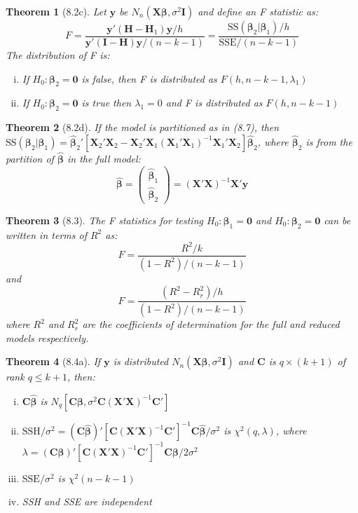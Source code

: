 \documentclass{article}
\newtheorem{theorem}{Theorem}[section]
\begin{document}
\begin{theorem}[8.2c]
Let $\mathbf{y}$ be $N_n(\mathbf{X}\boldsymbol{\beta}, \sigma^2\mathbf{I})$ and define an F statistic as:
\[F = \frac{\mathbf{y}'(\mathbf{H}-\mathbf{H}_1)\mathbf{y}/h}{\mathbf{y}'(\mathbf{I}-\mathbf{H})\mathbf{y}/(n-k-1)} = \frac{\text{SS}(\boldsymbol{\beta}_2|\boldsymbol{\beta}_1)/h}{\text{SSE}/(n-k-1)}\]
The distribution of F is:
\begin{enumerate}[(i)]
\item If $H_0:\boldsymbol{\beta}_2 = \mathbf{0}$ is false, then F is distributed as $F(h,n-k-1,\lambda_1)$
\item If $H_0:\boldsymbol{\beta}_2 = \mathbf{0}$ is true then $\lambda_1 = 0$ and F is distributed as $F(h,n-k-1)$
\end{enumerate}
\end{theorem}

\begin{theorem}[8.2d]
If the model is partitioned as in (8.7), then $\text{SS}(\boldsymbol{\beta}_2|\boldsymbol{\beta}_1) = \hat{\boldsymbol{\beta}}_2'[\mathbf{X}_2'\mathbf{X}_2 - \mathbf{X}_2'\mathbf{X}_1(\mathbf{X}_1'\mathbf{X}_1)^{-1}\mathbf{X}_1'\mathbf{X}_2]\hat{\boldsymbol{\beta}}_2$, where $\hat{\boldsymbol{\beta}}_2$ is from the partition of $\hat{\boldsymbol{\beta}}$ in the full model:
\[\hat{\boldsymbol{\beta}} = \begin{pmatrix} \hat{\boldsymbol{\beta}}_1 \\ \hat{\boldsymbol{\beta}}_2\end{pmatrix} = (\mathbf{X}'\mathbf{X})^{-1}\mathbf{X}'\mathbf{y}\]
\end{theorem}

\begin{theorem}[8.3]
The F statistics for testing $H_0: \boldsymbol{\beta}_1 = \mathbf{0}$ and $H_0: \boldsymbol{\beta}_2 = \mathbf{0}$ can be written in terms of $R^2$ as:
\[F = \frac{R^2/k}{(1-R^2)/(n-k-1)}\]
and
\[F = \frac{(R^2 - R_r^2)/h}{(1-R^2)/(n-k-1)}\]
where $R^2$ and $R_r^2$ are the coefficients of determination for the full and reduced models respectively.
\end{theorem}

\begin{theorem}[8.4a]
If $\mathbf{y}$ is distributed $N_n(\mathbf{X}\boldsymbol{\beta}, \sigma^2\mathbf{I})$ and $\mathbf{C}$ is $q \times (k+1)$ of rank $q \leq k+1$, then:
\begin{enumerate}[(i)]
\item $\mathbf{C}\hat{\boldsymbol{\beta}}$ is $N_q[\mathbf{C}\boldsymbol{\beta}, \sigma^2\mathbf{C}(\mathbf{X}'\mathbf{X})^{-1}\mathbf{C}']$
\item $\text{SSH}/\sigma^2 = (\mathbf{C}\hat{\boldsymbol{\beta}})'[\mathbf{C}(\mathbf{X}'\mathbf{X})^{-1}\mathbf{C}']^{-1}\mathbf{C}\hat{\boldsymbol{\beta}}/\sigma^2$ is $\chi^2(q,\lambda)$, where $\lambda = (\mathbf{C}\boldsymbol{\beta})'[\mathbf{C}(\mathbf{X}'\mathbf{X})^{-1}\mathbf{C}']^{-1}\mathbf{C}\boldsymbol{\beta}/2\sigma^2$
\item $\text{SSE}/\sigma^2$ is $\chi^2(n-k-1)$
\item SSH and SSE are independent
\end{enumerate}
\end{theorem}
\end{document}
